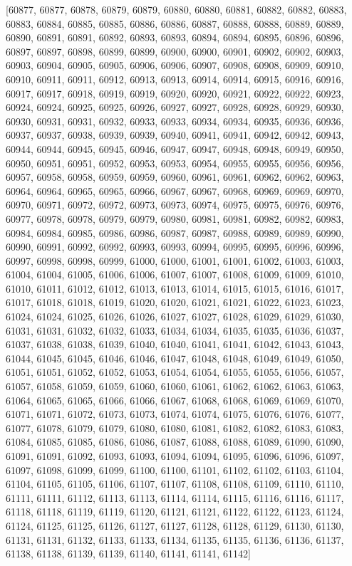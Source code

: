 \documentclass[dvipsnames, svgnames,a4paper,11pt]{article}
\begin{document}
	[60877, 60877, 60878, 60879, 60879, 60880, 60880, 60881, 60882, 60882, 60883, 60883, 60884, 60885, 60885, 60886, 60886, 60887, 60888, 60888, 60889, 60889, 60890, 60891, 60891, 60892, 60893, 60893, 60894, 60894, 60895, 60896, 60896, 60897, 60897, 60898, 60899, 60899, 60900, 60900, 60901, 60902, 60902, 60903, 60903, 60904, 60905, 60905, 60906, 60906, 60907, 60908, 60908, 60909, 60910, 60910, 60911, 60911, 60912, 60913, 60913, 60914, 60914, 60915, 60916, 60916, 60917, 60917, 60918, 60919, 60919, 60920, 60920, 60921, 60922, 60922, 60923, 60924, 60924, 60925, 60925, 60926, 60927, 60927, 60928, 60928, 60929, 60930, 60930, 60931, 60931, 60932, 60933, 60933, 60934, 60934, 60935, 60936, 60936, 60937, 60937, 60938, 60939, 60939, 60940, 60941, 60941, 60942, 60942, 60943, 60944, 60944, 60945, 60945, 60946, 60947, 60947, 60948, 60948, 60949, 60950, 60950, 60951, 60951, 60952, 60953, 60953, 60954, 60955, 60955, 60956, 60956, 60957, 60958, 60958, 60959, 60959, 60960, 60961, 60961, 60962, 60962, 60963, 60964, 60964, 60965, 60965, 60966, 60967, 60967, 60968, 60969, 60969, 60970, 60970, 60971, 60972, 60972, 60973, 60973, 60974, 60975, 60975, 60976, 60976, 60977, 60978, 60978, 60979, 60979, 60980, 60981, 60981, 60982, 60982, 60983, 60984, 60984, 60985, 60986, 60986, 60987, 60987, 60988, 60989, 60989, 60990, 60990, 60991, 60992, 60992, 60993, 60993, 60994, 60995, 60995, 60996, 60996, 60997, 60998, 60998, 60999, 61000, 61000, 61001, 61001, 61002, 61003, 61003, 61004, 61004, 61005, 61006, 61006, 61007, 61007, 61008, 61009, 61009, 61010, 61010, 61011, 61012, 61012, 61013, 61013, 61014, 61015, 61015, 61016, 61017, 61017, 61018, 61018, 61019, 61020, 61020, 61021, 61021, 61022, 61023, 61023, 61024, 61024, 61025, 61026, 61026, 61027, 61027, 61028, 61029, 61029, 61030, 61031, 61031, 61032, 61032, 61033, 61034, 61034, 61035, 61035, 61036, 61037, 61037, 61038, 61038, 61039, 61040, 61040, 61041, 61041, 61042, 61043, 61043, 61044, 61045, 61045, 61046, 61046, 61047, 61048, 61048, 61049, 61049, 61050, 61051, 61051, 61052, 61052, 61053, 61054, 61054, 61055, 61055, 61056, 61057, 61057, 61058, 61059, 61059, 61060, 61060, 61061, 61062, 61062, 61063, 61063, 61064, 61065, 61065, 61066, 61066, 61067, 61068, 61068, 61069, 61069, 61070, 61071, 61071, 61072, 61073, 61073, 61074, 61074, 61075, 61076, 61076, 61077, 61077, 61078, 61079, 61079, 61080, 61080, 61081, 61082, 61082, 61083, 61083, 61084, 61085, 61085, 61086, 61086, 61087, 61088, 61088, 61089, 61090, 61090, 61091, 61091, 61092, 61093, 61093, 61094, 61094, 61095, 61096, 61096, 61097, 61097, 61098, 61099, 61099, 61100, 61100, 61101, 61102, 61102, 61103, 61104, 61104, 61105, 61105, 61106, 61107, 61107, 61108, 61108, 61109, 61110, 61110, 61111, 61111, 61112, 61113, 61113, 61114, 61114, 61115, 61116, 61116, 61117, 61118, 61118, 61119, 61119, 61120, 61121, 61121, 61122, 61122, 61123, 61124, 61124, 61125, 61125, 61126, 61127, 61127, 61128, 61128, 61129, 61130, 61130, 61131, 61131, 61132, 61133, 61133, 61134, 61135, 61135, 61136, 61136, 61137, 61138, 61138, 61139, 61139, 61140, 61141, 61141, 61142]
	
\end{document}
